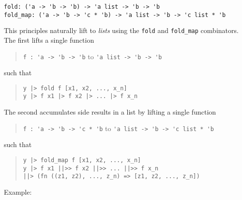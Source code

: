 \begin{isabellebody}
\begin{isamarkuptext}
\begin{mldecls}
  \end{mldecls}%
\end{isamarkuptext}%
\isamarkuptrue%
%
\isadelimmlref
%
\endisadelimmlref
%
\isatagmlref
%
\begin{isamarkuptext}%
\begin{mldecls}
  \verb|fold: ('a -> 'b -> 'b) -> 'a list -> 'b -> 'b| \\
  \verb|fold_map: ('a -> 'b -> 'c * 'b) -> 'a list -> 'b -> 'c list * 'b| \\
  \end{mldecls}%
\end{isamarkuptext}%
\isamarkuptrue%
%
\endisatagmlref
{\isafoldmlref}%
%
\isadelimmlref
%
\endisadelimmlref
%
\begin{isamarkuptext}%
\noindent This principles naturally lift to \emph{lists} using
  the \verb|fold| and \verb|fold_map| combinators.
  The first lifts a single function
  \begin{quote}\footnotesize
    \verb|f : 'a -> 'b -> 'b| to \verb|'a list -> 'b -> 'b|
  \end{quote}
  such that
  \begin{quote}\footnotesize
    \verb|y |\verb,|,\verb|> fold f [x1, x2, ..., x_n]| \\
    \hspace*{2ex}\isa{{\isasymleadsto}} \verb|y |\verb,|,\verb|> f x1 |\verb,|,\verb|> f x2 |\verb,|,\verb|> ... |\verb,|,\verb|> f x_n|
  \end{quote}
  \noindent The second accumulates side results in a list by lifting
  a single function
  \begin{quote}\footnotesize
    \verb|f : 'a -> 'b -> 'c * 'b| to \verb|'a list -> 'b -> 'c list * 'b|
  \end{quote}
  such that
  \begin{quote}\footnotesize
    \verb|y |\verb,|,\verb|> fold_map f [x1, x2, ..., x_n]| \\
    \hspace*{2ex}\isa{{\isasymleadsto}} \verb|y |\verb,|,\verb|> f x1 |\verb,|,\verb||\verb,|,\verb|>> f x2 |\verb,|,\verb||\verb,|,\verb|>> ... |\verb,|,\verb||\verb,|,\verb|>> f x_n| \\
    \hspace*{6ex}\verb||\verb,|,\verb||\verb,|,\verb|> (fn ((z1, z2), ..., z_n) => [z1, z2, ..., z_n])|
  \end{quote}
  
  \noindent Example:


\end{isamarkuptext}
\end{isabellebody}
